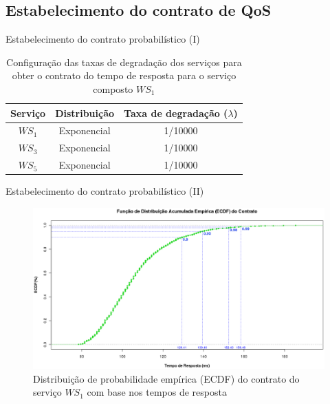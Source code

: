\documentclass[xcolor=svgnames]{beamer}
\newcommand {\otoprule}{\midrule [\heavyrulewidth]}  %
\begin{document}
\subsection{Estabelecimento do contrato de QoS}

  \begin{frame}{Estabelecimento do contrato probabilístico (I)}
      \begin{table}[!h]
	    \centering
      {\footnotesize
	    \caption{Configuração das taxas de degradação dos serviços  para obter o contrato do tempo de resposta para o serviço composto $WS_1$ }
	    \label{table:contract_configurations}
	  \begin{tabular}{ccc}
		\toprule
		\textbf{Serviço}    &   \textbf{Distribuição}      &     \textbf{Taxa de degradação ($\lambda$)}      \\
		\otoprule
		$WS_1$     &    Exponencial      &      1/10000      \\
		$WS_3$     &    Exponencial      &      1/10000      \\
		$WS_5$     &    Exponencial      &      1/10000      \\
		\bottomrule
		\end{tabular}
      }
      \end{table}
  \end{frame}
  

  \begin{frame}{Estabelecimento do contrato probabilístico (II)}
    \begin{figure}[H]
	\centering
	\includegraphics[width=1.0\linewidth]{figures/contract.png}
	\caption{Distribuição de probabilidade empírica (ECDF) do contrato do serviço $WS_1$ com base nos tempos de resposta  }
	\label{figure:contract}
    \end{figure}
  \end{frame}
\end{document}
